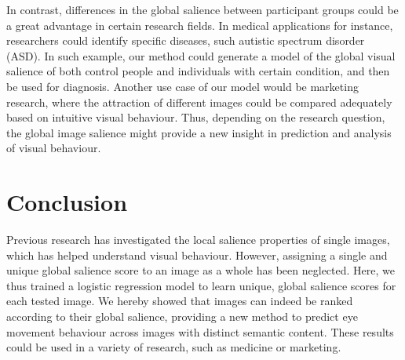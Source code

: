 {In contrast, differences in the global salience between participant groups could be a great advantage in certain research fields. In medical applications for instance, researchers could identify specific diseases, such autistic spectrum disorder (ASD). In such example, our method could generate a model of the global visual salience of both control people and individuals with certain condition, and then be used for diagnosis. Another use case of our model would be marketing research, where the attraction of different images could be compared adequately based on intuitive visual behaviour. Thus, depending on the research question, the global image salience might provide a new insight in prediction and analysis of visual behaviour.

\section{Conclusion}
\label{sec:conclusion}

Previous research has investigated the local salience properties of single images, which has helped understand visual behaviour. However, assigning a single and unique global salience score to an image as a whole has been neglected. Here, we thus trained a logistic regression model to learn unique, global salience scores for each tested image. We hereby showed that images can indeed be ranked according to their global salience, providing a new method to predict eye movement behaviour across images with distinct semantic content. These results could be used in a variety of research, such as medicine or marketing.

\chapterbibliography
}
